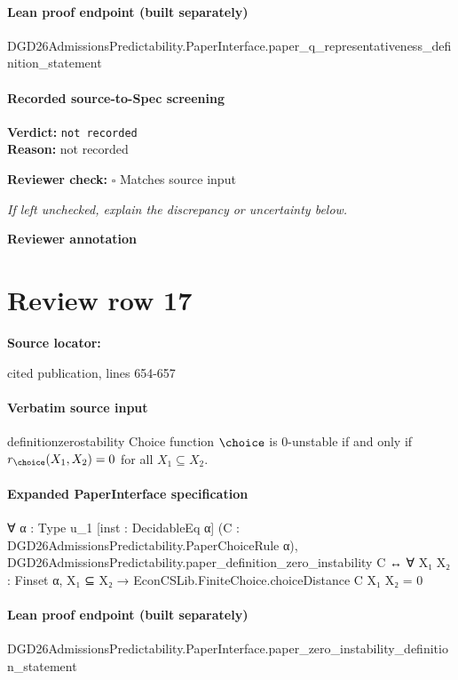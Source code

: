 \documentclass[10pt]{article}
\newcommand{\reviewerbox}{%
  \par\noindent\fbox{\parbox{0.96\linewidth}{\rule{0pt}{0.38in}}}\par
}
\newcommand{\reviewmatch}[1]{%
  \par\noindent\textbf{Reviewer check:} $\square$\; #1\par
  \noindent\emph{If left unchecked, explain the discrepancy or uncertainty below.}\par
}
\begin{document}
\paragraph{Lean proof endpoint (built separately)}\begin{ReviewVerbatim}
DGD26AdmissionsPredictability.PaperInterface.paper_q_representativeness_definition_statement
\end{ReviewVerbatim}

\paragraph{Recorded source-to-Spec screening}
\textbf{Verdict:} \texttt{not recorded}
\\
\textbf{Reason:} not recorded
\reviewmatch{Matches source input}
\noindent\textbf{Reviewer annotation}\par
\reviewerbox
\clearpage
\hypertarget{source-claim-3a97b71dd915eed1}{}
\section*{Review row 17}
\textbf{Source locator:} {\footnotesize\raggedright cited publication, lines 654-\allowbreak{}657\par}
\paragraph{Verbatim source input}
\begin{ReviewVerbatim}
\begin{restatable}[$0$-Instability]{definition}{zerostability}
\label{def:zero-instability}
Choice function $\choice$ is 0-unstable if and only if $r_\choice(X_1, X_2) = 0$ for all $X_1 \subseteq X_2$.
\end{restatable}
\end{ReviewVerbatim}


\paragraph{Expanded PaperInterface specification}
\begin{ReviewVerbatim}
∀ {α : Type u_1} [inst : DecidableEq α] (C : DGD26AdmissionsPredictability.PaperChoiceRule α),
  DGD26AdmissionsPredictability.paper_definition_zero_instability C ↔
    ∀ {X₁ X₂ : Finset α}, X₁ ⊆ X₂ → EconCSLib.FiniteChoice.choiceDistance C X₁ X₂ = 0
\end{ReviewVerbatim}

\paragraph{Lean proof endpoint (built separately)}\begin{ReviewVerbatim}
DGD26AdmissionsPredictability.PaperInterface.paper_zero_instability_definition_statement
\end{ReviewVerbatim}
\end{document}
